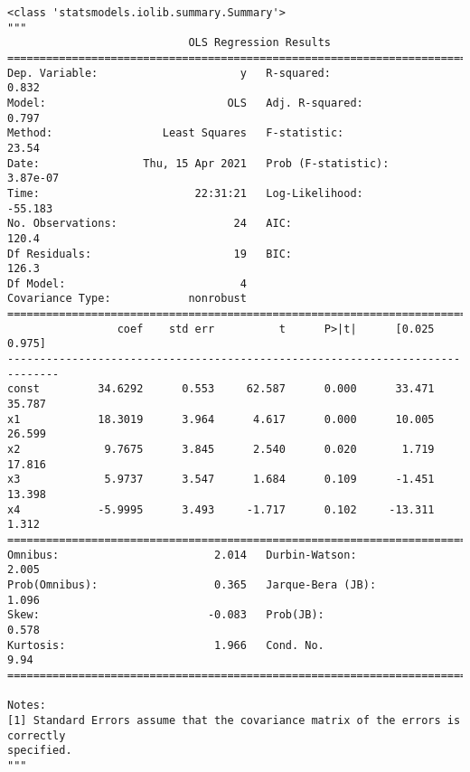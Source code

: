 \documentclass[11pt]{ctexart}
\makeatletter
\newcommand{\boxspacing}{\kern\kvtcb@left@rule\kern\kvtcb@boxsep}
\newcommand{\prompt}[4]{
        {\ttfamily\llap{{\color{#2}[#3]:\hspace{3pt}#4}}\vspace{-\baselineskip}}
    }
\makeatother
\begin{document}
            \begin{tcolorbox}[breakable, size=fbox, boxrule=.5pt, pad at break*=1mm, opacityfill=0]
\prompt{Out}{outcolor}{15}{\boxspacing}
\begin{Verbatim}[commandchars=\\\{\}]
<class 'statsmodels.iolib.summary.Summary'>
"""
                            OLS Regression Results
==============================================================================
Dep. Variable:                      y   R-squared:                       0.832
Model:                            OLS   Adj. R-squared:                  0.797
Method:                 Least Squares   F-statistic:                     23.54
Date:                Thu, 15 Apr 2021   Prob (F-statistic):           3.87e-07
Time:                        22:31:21   Log-Likelihood:                -55.183
No. Observations:                  24   AIC:                             120.4
Df Residuals:                      19   BIC:                             126.3
Df Model:                           4
Covariance Type:            nonrobust
==============================================================================
                 coef    std err          t      P>|t|      [0.025      0.975]
------------------------------------------------------------------------------
const         34.6292      0.553     62.587      0.000      33.471      35.787
x1            18.3019      3.964      4.617      0.000      10.005      26.599
x2             9.7675      3.845      2.540      0.020       1.719      17.816
x3             5.9737      3.547      1.684      0.109      -1.451      13.398
x4            -5.9995      3.493     -1.717      0.102     -13.311       1.312
==============================================================================
Omnibus:                        2.014   Durbin-Watson:                   2.005
Prob(Omnibus):                  0.365   Jarque-Bera (JB):                1.096
Skew:                          -0.083   Prob(JB):                        0.578
Kurtosis:                       1.966   Cond. No.                         9.94
==============================================================================

Notes:
[1] Standard Errors assume that the covariance matrix of the errors is correctly
specified.
"""
\end{Verbatim}
\end{tcolorbox}
        
\end{document}
